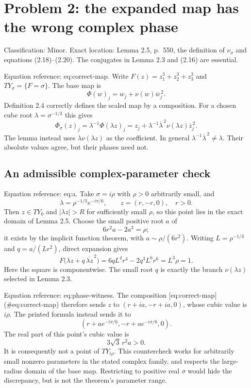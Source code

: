 \documentclass[10pt]{article}
\begin{document}
\section*{Problem 2: the expanded map has the wrong complex phase}
Classification: Minor. Exact location: Lemma 2.5, p. 550, the definition of \(\nu_\sigma\) and equations (2.18)–(2.20). The conjugates in Lemma 2.3 and (2.16) are essential.\par
Equation reference: eq:correct-map. Write \(F(z)=z_1^3+z_2^3+z_3^3\) and \(TY_\sigma=\{F=\sigma\}\). The base map is \[\Phi(w)_j=w_j+\nu(w)\overline w_j^{\,2}.\] Definition 2.4 correctly defines the scaled map by a composition. For a chosen cube root \(\lambda=\sigma^{-1/3}\) this gives \[\Phi_\sigma(z)_j
 =\lambda^{-1}\Phi(\lambda z)_j
 =z_j+\lambda^{-1}\overline\lambda^{\,2}
             \nu(\lambda z)\overline z_j^{\,2}.
 \] The lemma instead uses \(\lambda\nu(\lambda z)\) as the coefficient. In general \(\lambda^{-1}\overline\lambda^{\,2}\neq\lambda\). Their absolute values agree, but their phases need not.\par
\subsection*{An admissible complex-parameter check}
Equation reference: eq:a. Take \(\sigma=i\rho\) with \(\rho>0\) arbitrarily small, and \[\lambda=\rho^{-1/3}e^{-i\pi/6},\qquad
 z=(r,-r,0),\quad r>0.\] Then \(z\in TY_0\) and \(|\lambda z|>R\) for sufficiently small \(\rho\), so this point lies in the exact domain of Lemma 2.5. Choose the small positive root \(a\) of \[6r^2a-2a^3=\rho;
 \] it exists by the implicit function theorem, with \(a\sim\rho/(6r^2)\). Writing \(L=\rho^{-1/3}\) and \(q=a/(Lr^2)\), direct expansion gives \[F\bigl(\lambda z+q\,\overline{\lambda z}^{\,2}\bigr)
   =6qL^4r^4-2q^3L^6r^6=L^3\rho=1.\] Here the square is componentwise. The small root \(q\) is exactly the branch \(\nu(\lambda z)\) selected in Lemma 2.3.\par
Equation reference: eq:phase-witness. The composition [eq:correct-map] (\#eq:correct-map) therefore sends \(z\) to \((r+ia,-r+ia,0)\), whose cubic value is \(i\rho\). The printed formula instead sends it to \[(r+ae^{-i\pi/6},-r+ae^{-i\pi/6},0).\] The real part of this point’s cubic value is \[3\sqrt3\,r^2a>0.
 \] It is consequently not a point of \(TY_{i\rho}\). This countercheck works for arbitrarily small nonzero parameters in the stated complex family, and respects the large-radius domain of the base map. Restricting to positive real \(\sigma\) would hide the discrepancy, but is not the theorem’s parameter range.\par
\end{document}
